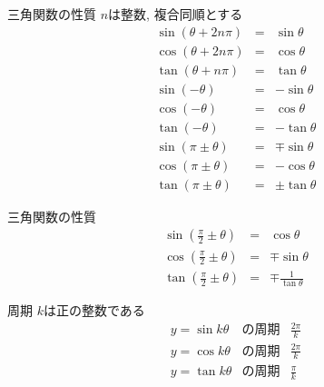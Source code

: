 \documentclass[aspectratio=169, 12pt]{beamer} %
\begin{document}
\begin{frame}{三角関数の性質}
    $n$は整数, 複合同順とする
    \begin{eqnarray*}
        \sin(\theta+2n\pi)&=&\sin\theta \\
        \cos(\theta+2n\pi)&=&\cos\theta \\
        \tan(\theta+n\pi)&=&\tan\theta \\
        \sin(-\theta)&=&-\sin\theta \\
        \cos(-\theta)&=&\cos\theta \\
        \tan(-\theta)&=&-\tan\theta \\
        \sin(\pi\pm\theta)&=&\mp\sin\theta \\
        \cos(\pi\pm\theta)&=&-\cos\theta \\
        \tan(\pi\pm\theta)&=&\pm\tan\theta
    \end{eqnarray*}
\end{frame}
\begin{frame}{三角関数の性質}
    \begin{eqnarray*}
        \sin(\frac{\pi}{2}\pm\theta)&=&\cos\theta \\
        \cos(\frac{\pi}{2}\pm\theta)&=&\mp\sin\theta \\
        \tan(\frac{\pi}{2}\pm\theta)&=&\mp\frac{1}{\tan\theta}
    \end{eqnarray*}
\end{frame}
\begin{frame}{周期}
    $k$は正の整数である
    \begin{eqnarray*}
        y=\sin k\theta&\text{の周期}&\frac{2\pi}{k} \\
        y=\cos k\theta&\text{の周期}&\frac{2\pi}{k} \\
        y=\tan k\theta&\text{の周期}&\frac{\pi}{k}
    \end{eqnarray*}
\end{frame}
\end{document}
